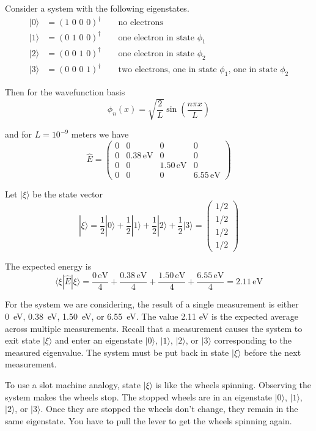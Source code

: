 \documentclass[12pt]{article}
\begin{document}
\noindent
Consider a system with the following eigenstates.
\begin{align*}
|0\rangle&=(\text{1 0 0 0})^\dag\qquad\text{no electrons}\\
|1\rangle&=(\text{0 1 0 0})^\dag\qquad\text{one electron in state $\phi_1$}\\
|2\rangle&=(\text{0 0 1 0})^\dag\qquad\text{one electron in state $\phi_2$}\\
|3\rangle&=(\text{0 0 0 1})^\dag\qquad\text{two electrons, one in state $\phi_1$, one in state $\phi_2$}
\end{align*}

\noindent
Then for the wavefunction basis
\begin{equation*}
\phi_n(x)=\sqrt{\frac{2}{L}}\sin\left(\frac{n\pi x}{L}\right)
\end{equation*}

\noindent
and for $L=10^{-9}$ meters we have
\begin{equation*}
\hat{E}=\begin{pmatrix}
0&0&0&0\\
0&0.38\,\text{eV}&0&0\\
0&0&1.50\,\text{eV}&0\\
0&0&0&6.55\,\text{eV}
\end{pmatrix}
\end{equation*}

\noindent
Let $|\xi\rangle$ be the state vector
\begin{equation*}
|\xi\rangle
=\frac{1}{2}|0\rangle+\frac{1}{2}|1\rangle+\frac{1}{2}|2\rangle+\frac{1}{2}|3\rangle
=\begin{pmatrix}1/2\\1/2\\1/2\\1/2\end{pmatrix}
\end{equation*}

\noindent
The expected energy is
\begin{equation*}
\langle\xi|\hat{E}|\xi\rangle
=\frac{0\,\text{eV}}{4}+\frac{0.38\,\text{eV}}{4}+\frac{1.50\,\text{eV}}{4}+\frac{6.55\,\text{eV}}{4}
=2.11\,\text{eV}
\end{equation*}

\noindent
For the system we are considering, the result of a single measurement is either
0~eV, 0.38~eV, 1.50~eV, or 6.55~eV.
The value 2.11 eV is the expected average across multiple measurements.
Recall that a measurement causes the system to exit state $|\xi\rangle$
and enter an eigenstate $|0\rangle$, $|1\rangle$, $|2\rangle$, or $|3\rangle$
corresponding to the measured eigenvalue.
The system must be put back in state $|\xi\rangle$ before the next measurement.

\bigskip
\noindent
To use a slot machine analogy, state $|\xi\rangle$ is like the wheels spinning.
Observing the system makes the wheels stop.
The stopped wheels are in an eigenstate $|0\rangle$, $|1\rangle$, $|2\rangle$, or $|3\rangle$.
Once they are stopped the wheels don't change, they remain in the same eigenstate.
You have to pull the lever to get the wheels spinning again.
\end{document}
